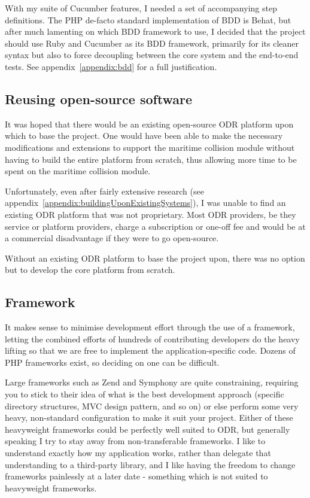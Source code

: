 With my suite of Cucumber features, I needed a set of accompanying step definitions. The PHP de-facto standard implementation of BDD is Behat,  but after much lamenting on which BDD framework to use, I decided that the project should use Ruby and Cucumber as its BDD framework, primarily for its cleaner syntax but also to force decoupling between the core system and the end-to-end tests. See appendix~\ref{appendix:bdd} for a full justification.

\subsection{Reusing open-source software}

It was hoped that there would be an existing open-source ODR platform upon which to base the project. One would have been able to make the necessary modifications and extensions to support the maritime collision module without having to build the entire platform from scratch, thus allowing more time to be spent on the maritime collision module.

Unfortunately, even after fairly extensive research (see appendix~\ref{appendix:buildingUponExistingSystems}), I was unable to find an existing ODR platform that was not proprietary. Most ODR providers, be they service or platform providers, charge a subscription or one-off fee and would be at a commercial disadvantage if they were to go open-source.

Without an existing ODR platform to base the project upon, there was no option but to develop the core platform from scratch.

\subsection{Framework}

It makes sense to minimise development effort through the use of a framework, letting the combined efforts of hundreds of contributing developers do the heavy lifting so that we are free to implement the application-specific code. Dozens of PHP frameworks exist, so deciding on one can be difficult.

Large frameworks such as Zend and Symphony are quite constraining, requiring you to stick to their idea of what is the best development approach (specific directory structures, MVC design pattern, and so on) or else perform some very heavy, non-standard configuration to make it suit your project. Either of these heavyweight frameworks could be perfectly well suited to ODR, but generally speaking I try to stay away from non-transferable frameworks. I like to understand exactly how my application works, rather than delegate that understanding to a third-party library, and I like having the freedom to change frameworks painlessly at a later date - something which is not suited to heavyweight frameworks.

